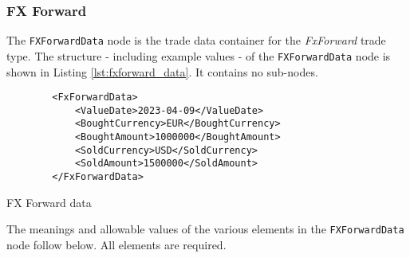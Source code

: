 \subsubsection{FX Forward}

The \lstinline!FXForwardData!  node is the trade data container for the \emph{FxForward} trade type.  The structure -
including example values - of the \lstinline!FXForwardData!  node is shown in Listing \ref{lst:fxforward_data}. It
contains no sub-nodes.

\begin{listing}[H]
\begin{verbatim}
        <FxForwardData>
            <ValueDate>2023-04-09</ValueDate>
            <BoughtCurrency>EUR</BoughtCurrency>
            <BoughtAmount>1000000</BoughtAmount>
            <SoldCurrency>USD</SoldCurrency>
            <SoldAmount>1500000</SoldAmount>
        </FxForwardData>
\end{verbatim}
\caption{FX Forward data}
\label{lst:fxforward_data}
\end{listing}

The meanings and allowable values of the various elements in the \lstinline!FXForwardData!  node follow below.  All elements are required.

